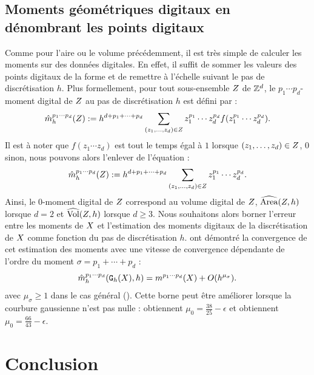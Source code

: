 \subsection{Moments géométriques digitaux en dénombrant les points digitaux}
\label{sec:MomentsByCounting}
%
Comme pour l'aire ou le volume précédemment, il est très simple de calculer les
moments sur des données digitales. En effet, il suffit de sommer les valeurs des
points digitaux de la forme et de remettre à l'échelle suivant le pas de
discrétisation $h$. Plus formellement, pour tout sous-ensemble $\DigShape$ de
$\Z^d$, le $p_1 \cdots p_d$-moment digital de $\DigShape$ au pas de
discrétisation $h$ est défini par :
%
\begin{equation}
  \DMom{p_1 \cdots p_d}{h}(\DigShape) \EqDef h^{d + p_1 + \cdots + p_d} \sum_{(z_1,\ldots,z_d) \in \DigShape} z_1^{p_1} \cdots z_d^{p_d} f(z_1^{p_1} \cdots z_d^{p_d}).
\end{equation}
%
Il est à noter que $f(z_1 \cdots z_d)$ est tout le temps égal à $1$ lorsque
$(z_1,\ldots,z_d) \in \DigShape$, $0$ sinon, nous pouvons alors l'enlever de
l'équation :
%
\begin{equation} \label{eq:MomentsByCounting-def}
%
  \DMom{p_1 \cdots p_d}{h}(\DigShape) \EqDef h^{d + p_1 + \cdots + p_d} \sum_{(z_1,\ldots,z_d) \in \DigShape} z_1^{p_1} \cdots z_d^{p_d}.
%
\end{equation}
%
Ainsi, le $0$-moment digital de $\DigShape$ correspond au volume digital de
$\DigShape$, \cad $\AreaC(\DigShape,h)$ lorsque $d = 2$ et $\VolC(\DigShape,h)$
lorsque $d \geq 3$.
%
Nous souhaitons alors borner l'erreur entre les moments de $\Shape$ et
l'estimation des moments digitaux de la discrétisation de $\Shape$ comme
fonction du pas de discrétisation $h$.  ont
démontré la convergence de cet estimation des moments avec une vitesse de
convergence dépendante de l'ordre du moment $\sigma = p_1 + \cdots + p_d$ :
%
\begin{equation} \label{eq:MomentsByCounting-conv}
%
  \DMom{p_1 \cdots p_d}{h}(\DigF{\Shape}{h},h) = \Mom{p_1 \cdots p_d}(\Shape) + O(h^{\mu_{\sigma}}).
%
\end{equation}
%
avec $\mu_{\sigma} \ge 1$ dans le cas général (). Cette
borne peut être améliorer lorsque la courbure gaussienne n'est pas nulle :
 obtiennent $\mu_0=\frac{38}{25}-\epsilon$ et
 obtiennent $\mu_0 = \frac{66}{43}-\epsilon$.
%
%
\section{Conclusion}
%
